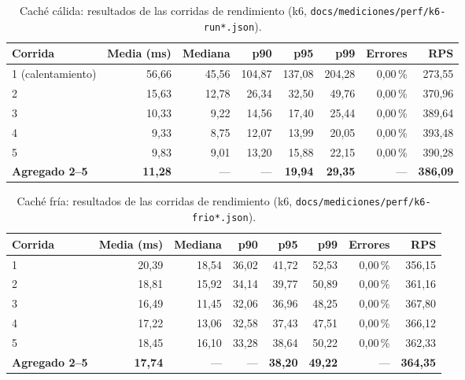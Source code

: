 \documentclass[11pt,a4paper]{article}
\newcommand{\ruta}[1]{\texttt{\footnotesize #1}}
\begin{document}
\begin{table}[htbp]
\centering
\caption{Caché cálida: resultados de las corridas de rendimiento (k6, \ruta{docs/mediciones/perf/k6-run*.json}).}
\label{tab:k6-resultados}
\begin{tabular}{@{}lrrrrrrr@{}}
\toprule
\textbf{Corrida} & \textbf{Media (ms)} & \textbf{Mediana} & \textbf{p90} & \textbf{p95} & \textbf{p99} & \textbf{Errores} & \textbf{RPS} \\
\midrule
1 (calentamiento) & 56,66 & 45,56 & 104,87 & 137,08 & 204,28 & 0,00\,\% & 273,55 \\
2 & 15,63 & 12,78 & 26,34 & 32,50 & 49,76 & 0,00\,\% & 370,96 \\
3 & 10,33 & 9,22  & 14,56 & 17,40 & 25,44 & 0,00\,\% & 389,64 \\
4 & 9,33  & 8,75  & 12,07 & 13,99 & 20,05 & 0,00\,\% & 393,48 \\
5 & 9,83  & 9,01  & 13,20 & 15,88 & 22,15 & 0,00\,\% & 390,28 \\
\midrule
\textbf{Agregado 2--5} & \textbf{11,28} & --- & --- & \textbf{19,94} & \textbf{29,35} & --- & \textbf{386,09} \\
\bottomrule
\end{tabular}
\end{table}

\begin{table}[htbp]
\centering
\caption{Caché fría: resultados de las corridas de rendimiento (k6, \ruta{docs/mediciones/perf/k6-frio*.json}).}
\label{tab:k6-resultados-frio}
\begin{tabular}{@{}lrrrrrrr@{}}
\toprule
\textbf{Corrida} & \textbf{Media (ms)} & \textbf{Mediana} & \textbf{p90} & \textbf{p95} & \textbf{p99} & \textbf{Errores} & \textbf{RPS} \\
\midrule
1 & 20,39 & 18,54 & 36,02 & 41,72 & 52,53 & 0,00\,\% & 356,15 \\
2 & 18,81 & 15,92 & 34,14 & 39,77 & 50,89 & 0,00\,\% & 361,16 \\
3 & 16,49 & 11,45 & 32,06 & 36,96 & 48,25 & 0,00\,\% & 367,80 \\
4 & 17,22 & 13,06 & 32,58 & 37,43 & 47,51 & 0,00\,\% & 366,12 \\
5 & 18,45 & 16,10 & 33,28 & 38,64 & 50,22 & 0,00\,\% & 362,33 \\
\midrule
\textbf{Agregado 2--5} & \textbf{17,74} & --- & --- & \textbf{38,20} & \textbf{49,22} & --- & \textbf{364,35} \\
\bottomrule
\end{tabular}
\end{table}
\end{document}
